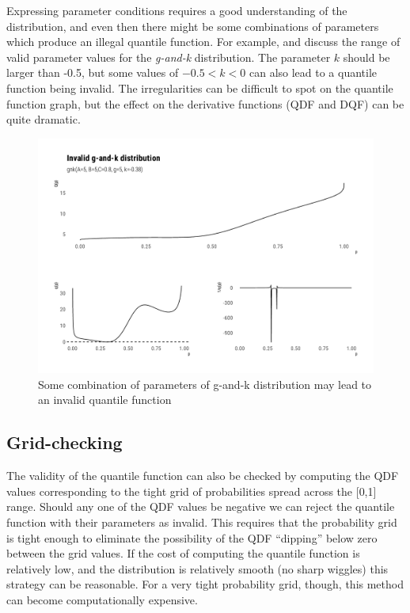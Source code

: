 \documentclass[
  12pt,
]{article}
\begin{document}
Expressing parameter conditions requires a good understanding of the distribution, and even then there might be some combinations of parameters which produce an illegal quantile function. For example, \citet{prangle2017GkPackageGandk} and \citet{rayner2002NumericalMaximumLikelihood} discuss the range of valid parameter values for the \emph{g-and-k} distribution. The parameter \(k\) should be larger than -0.5, but some values of \(-0.5<k<0\) can also lead to a quantile function being invalid. The irregularities can be difficult to spot on the quantile function graph, but the effect on the derivative functions (QDF and DQF) can be quite dramatic.

\begin{figure}

{\centering \includegraphics[width=0.8\linewidth]{ilbm_article_files/figure-latex/invalid-gnk-graph-1} 

}

\caption{Some combination of parameters of g-and-k distribution may lead to an invalid quantile function}\label{fig:invalid-gnk-graph}
\end{figure}

\hypertarget{grid-checking}{%
\subsection{Grid-checking}\label{grid-checking}}

The validity of the quantile function can also be checked by computing the QDF values corresponding to the tight grid of probabilities spread across the {[}0,1{]} range. Should any one of the QDF values be negative we can reject the quantile function with their parameters as invalid. This requires that the probability grid is tight enough to eliminate the possibility of the QDF ``dipping'' below zero between the grid values. If the cost of computing the quantile function is relatively low, and the distribution is relatively smooth (no sharp wiggles) this strategy can be reasonable. For a very tight probability grid, though, this method can become computationally expensive.
\end{document}
